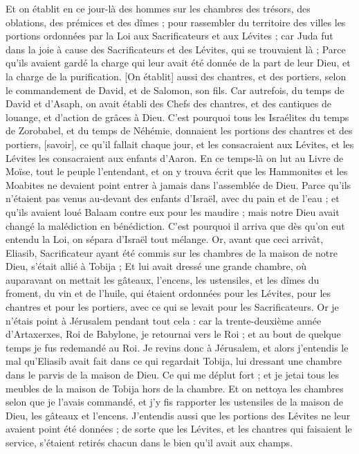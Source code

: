 \begin{multicols}{2}
{Et on établit en ce jour-là des hommes sur les chambres des trésors, des oblations, des prémices et des dîmes ; pour rassembler du territoire des villes les portions ordonnées par la Loi aux Sacrificateurs et aux Lévites ; car Juda fut dans la joie à cause des Sacrificateurs et des Lévites, qui se trouvaient là ;
Parce qu'ils avaient gardé la charge qui leur avait été donnée de la part de leur Dieu, et la charge de la purification. [On établit] aussi des chantres, et des portiers, selon le commandement de David, et de Salomon, son fils.
Car autrefois, du temps de David et d'Asaph, on avait établi des Chefs des chantres, et des cantiques de louange, et d'action de grâces à Dieu.
C'est pourquoi tous les Israélites du temps de Zorobabel, et du temps de Néhémie, donnaient les portions des chantres et des portiers, [savoir], ce qu'il fallait chaque jour, et les consacraient aux Lévites, et les Lévites les consacraient aux enfants d'Aaron.
\VerseOne{}En ce temps-là on lut au Livre de Moïse, tout le peuple l'entendant, et on y trouva écrit que les Hammonites et les Moabites ne devaient point entrer à jamais dans l'assemblée de Dieu.
Parce qu'ils n'étaient pas venus au-devant des enfants d'Israël, avec du pain et de l'eau ; et qu'ils avaient loué Balaam contre eux pour les maudire ; mais notre Dieu avait changé la malédiction en bénédiction.
C'est pourquoi il arriva que dès qu'on eut entendu la Loi, on sépara d'Israël tout mélange.
Or, avant que ceci arrivât, Eliasib, Sacrificateur ayant été commis sur les chambres de la maison de notre Dieu, s'était allié à Tobija ;
Et lui avait dressé une grande chambre, où auparavant on mettait les gâteaux, l'encens, les ustensiles, et les dîmes du froment, du vin et de l'huile, qui étaient ordonnées pour les Lévites, pour les chantres et pour les portiers, avec ce qui se levait pour les Sacrificateurs.
Or je n'étais point à Jérusalem pendant tout cela : car la trente-deuxième année d'Artaxerxes, Roi de Babylone, je retournai vers le Roi ; et au bout de quelque temps je fus redemandé au Roi.
Je revins donc à Jérusalem, et alors j'entendis le mal qu'Eliasib avait fait dans ce qui regardait Tobija, lui dressant une chambre dans le parvis de la maison de Dieu.
Ce qui me déplut fort ; et je jetai tous les meubles de la maison de Tobija hors de la chambre.
Et on nettoya les chambres selon que je l'avais commandé, et j'y fis rapporter les ustensiles de la maison de Dieu, les gâteaux et l'encens.
J'entendis aussi que les portions des Lévites ne leur avaient point été données ; de sorte que les Lévites, et les chantres qui faisaient le service, s'étaient retirés chacun dans le bien qu'il avait aux champs.
}
\end{multicols}
